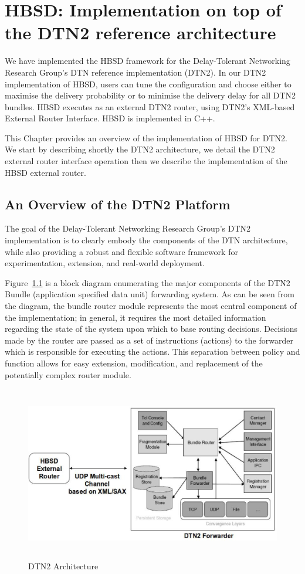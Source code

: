 \chapter{HBSD: Implementation on top of the DTN2 reference architecture}
\label{chapter:HBSD}
\minitoc

We have implemented the HBSD framework for the Delay-Tolerant Networking Research Group's DTN reference implementation (DTN2). 
In our DTN2 implementation of HBSD, users can tune the configuration and choose either to maximise the
delivery probability or to minimise the delivery delay for all DTN2 bundles. HBSD executes as an external DTN2 router, using DTN2's XML-based External Router Interface. HBSD is implemented in C++. 

This Chapter provides an overview of the implementation of HBSD for DTN2. We start by describing shortly the DTN2 architecture, we detail the DTN2 external router interface operation then we describe the implementation of the HBSD external router.

\section{An Overview of the DTN2 Platform}
\label{DTN2}

The goal of the Delay-Tolerant Networking Research Group's DTN2  implementation is to clearly embody the components of the DTN architecture, while also providing a robust and flexible software framework for experimentation, extension, and real-world deployment.

Figure~\ref{DTN2-Arch} is a block diagram enumerating the major components of the DTN2 Bundle (application specified data 
unit) forwarding system. As can be seen from the diagram, the bundle router module represents the most central component of the implementation; in general, it requires the most detailed information regarding the state of the system upon which to base routing decisions. Decisions made by the router are passed as a set of instructions (actions) to the forwarder which is responsible for executing the actions. This separation between policy and function allows for easy extension, modification, and
replacement of the potentially complex router module. 

\begin{figure}[!h]
\centering
\includegraphics[width=5in,height=3in]{Chapitre4/HBSD-DTN2.eps}
\caption{DTN2 Architecture}
\label{DTN2-Arch}
\end{figure}

